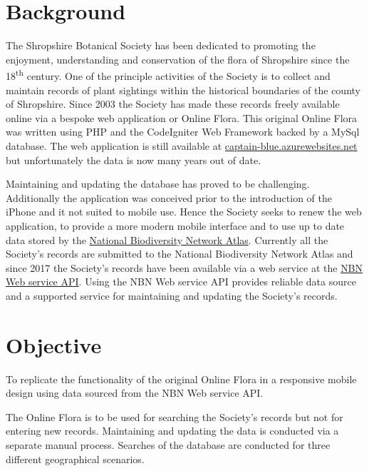 \documentclass[a4paper,12pt,landscape]{article}
\begin{document}
\begin{multicols*}{2}
  \setcounter{tocdepth}{3}
  \tableofcontents
  \columnbreak

  \section{Background}
  The Shropshire Botanical Society
  has been dedicated to promoting the enjoyment,
  understanding and conservation of the flora of Shropshire
  since the 18\textsuperscript{th} century.
  One of the principle activities of the Society is to collect and maintain records 
  of plant sightings within the historical boundaries of the county of Shropshire.
  Since 2003 the Society has made these records freely available online via a bespoke web application
  or Online Flora.
  This original Online Flora was written using
  PHP and the CodeIgniter Web Framework
  backed by a MySql database.
  The web application is still available at 
  \href{https://captain-blue.azurewebsites.net/}{captain-blue.azurewebsites.net}
  but unfortunately the data is now many years out of date.

  Maintaining and updating the database has proved to be challenging.
  Additionally the application was conceived prior to the introduction of the iPhone
  and it not suited to mobile use.
  Hence the Society seeks to renew the web application,
  to provide a more modern mobile interface
  and to use up to date data stored
  by the \href{https://nbnatlas.org/}{National Biodiversity Network Atlas}.
  Currently all the Society's records are submitted to the 
  National Biodiversity Network Atlas
  and since 2017 the Society's records have been available via a web service at
  the \href{https://api.nbnatlas.org/}{NBN Web service API}.
  Using the NBN Web service API provides reliable data source
  and
  a supported service for maintaining and updating the Society's records.

  \clearpage

  \section{Objective}
  To replicate the functionality of the original Online Flora
  in a responsive mobile design
  using data sourced from the NBN Web service API.

  The Online Flora is to be used for searching the Society's records
  but not for entering new records.
  Maintaining and updating the data is conducted via a separate manual process.
  Searches of the database are conducted for three different geographical scenarios.


\end{multicols*}
\end{document}
